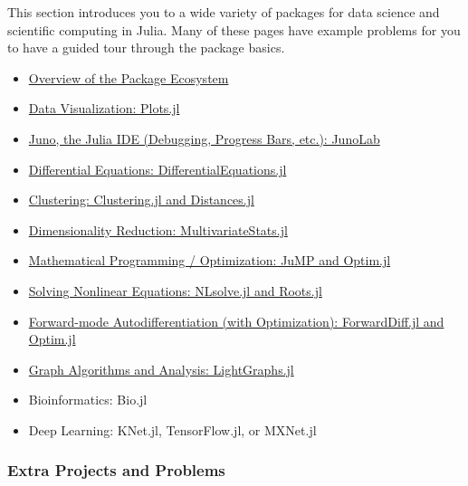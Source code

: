 \documentclass[11pt]{article}
\begin{document}
This section introduces you to a wide variety of packages for data
science and scientific computing in Julia. Many of these pages have
example problems for you to have a guided tour through the package
basics.

\begin{itemize}
\itemsep1pt\parskip0pt
\item
  \href{http://ucidatascienceinitiative.github.io/IntroToJulia/Html/PackageEcosystem}{Overview
  of the Package Ecosystem}
\item
  \href{http://ucidatascienceinitiative.github.io/IntroToJulia/Html/PlotsJL}{Data
  Visualization: Plots.jl}
\item
  \href{https://chrisrackauckas.github.io/JunoDocs.jl/latest/}{Juno, the
  Julia IDE (Debugging, Progress Bars, etc.): JunoLab}
\item
  \href{http://ucidatascienceinitiative.github.io/IntroToJulia/Html/DiffEq}{Differential
  Equations: DifferentialEquations.jl}
\item
  \href{http://ucidatascienceinitiative.github.io/IntroToJulia/Html/Clustering}{Clustering:
  Clustering.jl and Distances.jl}
\item
  \href{http://ucidatascienceinitiative.github.io/IntroToJulia/Html/DimensionalityReduction}{Dimensionality
  Reduction: MultivariateStats.jl}
\item
  \href{http://ucidatascienceinitiative.github.io/IntroToJulia/Html/Optimization}{Mathematical
  Programming / Optimization: JuMP and Optim.jl}
\item
  \href{http://ucidatascienceinitiative.github.io/IntroToJulia/Html/NonlinearSolve}{Solving
  Nonlinear Equations: NLsolve.jl and Roots.jl}
\item
  \href{http://ucidatascienceinitiative.github.io/IntroToJulia/Html/ForwardDiff}{Forward-mode
  Autodifferentiation (with Optimization): ForwardDiff.jl and Optim.jl}
\item
  \href{http://ucidatascienceinitiative.github.io/IntroToJulia/Html/Graphs}{Graph
  Algorithms and Analysis: LightGraphs.jl}
\item
  Bioinformatics: Bio.jl
\item
  Deep Learning: KNet.jl, TensorFlow.jl, or MXNet.jl
\end{itemize}

\subsubsection{Extra Projects and
Problems}\label{extra-projects-and-problems}
\end{document}
